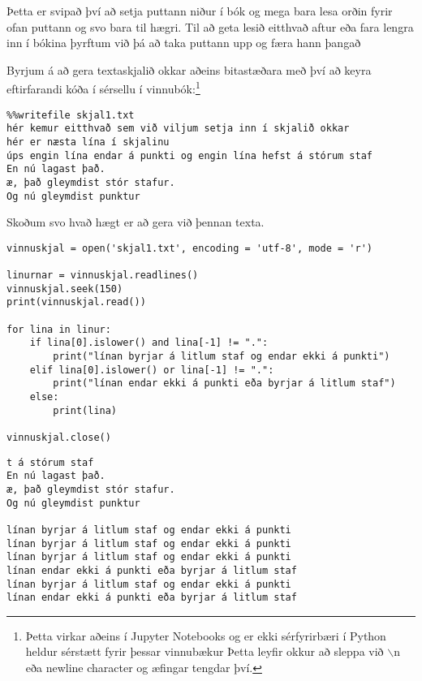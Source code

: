 Þetta er svipað því að setja puttann niður í bók og mega bara lesa orðin fyrir ofan puttann og svo bara til hægri.
Til að geta lesið eitthvað aftur eða fara lengra inn í bókina þyrftum við þá að taka puttann upp og færa hann þangað

Byrjum á að gera textaskjalið okkar aðeins bitastæðara með því að keyra eftirfarandi kóða í sérsellu í vinnubók:\footnote{Þetta virkar aðeins í Jupyter Notebooks og er ekki sérfyrirbæri í Python heldur sérstætt fyrir þessar vinnubækur
Þetta leyfir okkur að sleppa við $\backslash$n eða newline character og æfingar tengdar því.}
\begin{verbatim}
%%writefile skjal1.txt
hér kemur eitthvað sem við viljum setja inn í skjalið okkar
hér er næsta lína í skjalinu
úps engin lína endar á punkti og engin lína hefst á stórum staf
En nú lagast það.
æ, það gleymdist stór stafur.
Og nú gleymdist punktur
\end{verbatim}

Skoðum svo hvað hægt er að gera við þennan texta.

\begin{lstlisting}[caption=Hér sjáum við einfalda skjalavinnslu, label=lst:skjalavinnsla-open]
vinnuskjal = open('skjal1.txt', encoding = 'utf-8', mode = 'r')	

linurnar = vinnuskjal.readlines()
vinnuskjal.seek(150)
print(vinnuskjal.read())

for lina in linur:
	if lina[0].islower() and lina[-1] != ".":
		print("línan byrjar á litlum staf og endar ekki á punkti")
	elif lina[0].islower() or lina[-1] != ".":
		print("línan endar ekki á punkti eða byrjar á litlum staf")
	else:
		print(lina)

vinnuskjal.close()
\end{lstlisting}
\lstset{style=uttak}
\begin{lstlisting}
t á stórum staf
En nú lagast það.
æ, það gleymdist stór stafur.
Og nú gleymdist punktur

línan byrjar á litlum staf og endar ekki á punkti
línan byrjar á litlum staf og endar ekki á punkti
línan byrjar á litlum staf og endar ekki á punkti
línan endar ekki á punkti eða byrjar á litlum staf
línan byrjar á litlum staf og endar ekki á punkti
línan endar ekki á punkti eða byrjar á litlum staf
\end{lstlisting}
\lstset{style=venjulegt}

